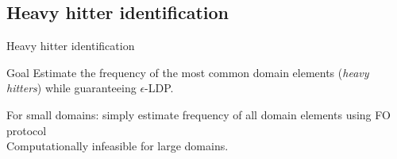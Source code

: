 \documentclass[aspectratio=43]{beamer}
\begin{document}






\subsection{Heavy hitter identification}

\begin{frame}{Heavy hitter identification}
    \begin{alertblock}{Goal}
        Estimate the frequency of the most common domain elements (\emph{heavy hitters}) while guaranteeing $\epsilon$-LDP.
    \end{alertblock}
    \bigskip
    For small domains: simply estimate frequency of all domain elements using FO protocol\\
    \bigskip
    Computationally infeasible for large domains. 
\end{frame}
\end{document}
